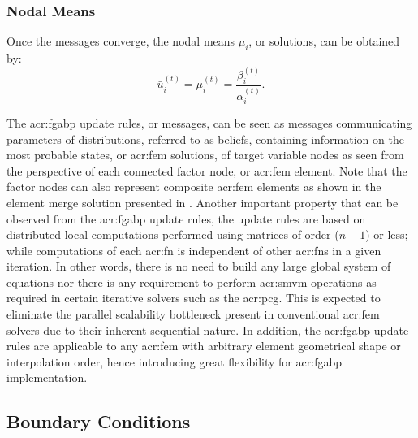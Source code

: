 \subsubsection{Nodal Means}

Once the messages converge, the nodal means $\mu_i$, or solutions, can be obtained by:
\begin{equation}
	\bar{u}_i^{(t)} = \mu_{i}^{(t)} =\frac{\beta_{i}^{(t)}}{\alpha_{i}^{(t)}}. \label{eqn:vnm}
\end{equation}


The \gls{acr:fgabp} update rules, or messages, can be seen as messages communicating parameters of distributions, referred to as beliefs, containing information on the most probable states, or \gls{acr:fem} solutions, of target variable nodes as seen from the perspective of each connected factor node, or \gls{acr:fem} element.
Note that the factor nodes can also represent composite \gls{acr:fem} elements as shown in the element merge solution presented in .
Another important property that can be observed from the \gls{acr:fgabp} update rules, the update rules are based on distributed local computations performed using matrices of order ($n-1$) or less; while computations of each \gls{acr:fn} is independent of other \glspl{acr:fn} in a given iteration.
In other words, there is no need to build any large global system of equations nor there is any requirement to perform \gls{acr:smvm} operations as required in certain iterative solvers such as the \gls{acr:pcg}.
This is expected to eliminate the parallel scalability bottleneck present in conventional \gls{acr:fem} solvers due to their inherent sequential nature.
In addition, the \gls{acr:fgabp} update rules are applicable to any \gls{acr:fem} with arbitrary element geometrical shape or interpolation order, hence introducing great flexibility for \gls{acr:fgabp} implementation.


\subsection{Boundary Conditions}

